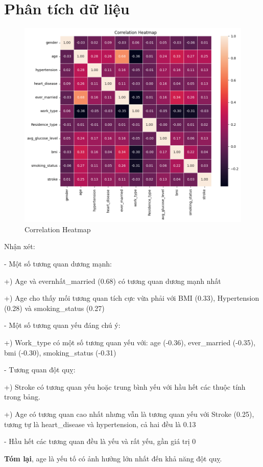\documentclass[11pt]{article}
\begin{document}
	\section{Phân tích dữ liệu}
	
	\begin{figure}[H]
		\centering
		\includegraphics[width=0.7\linewidth]{correlationHeatmap}
		\caption{Correlation Heatmap}
		\label{fig:correlationheatmap}
	\end{figure}
	Nhận xét:
	
	
	\begin{flushleft}
		- Một số tương quan dương mạnh:
		
		+) Age và evernhất\_married (0.68) có tương quan dương mạnh nhất
		
		+) Age cho thấy mối tương quan tích cực vừa phải với BMI (0.33), Hypertension (0.28) và smoking\_status (0.27)
		\vspace{0.2cm}
		
		- Một số tương quan yếu đáng chú ý:
		
		+) Work\_type có một số tương quan yếu với: age (-0.36), ever\_married (-0.35), bmi (-0.30), smoking\_status (-0.31)
		\vspace{0.2cm}
		
		- Tương quan đột quỵ:
		
		+) Stroke có tương quan yếu hoặc trung bình yếu với hầu hết các thuộc tính trong bảng.
		
		+) Age có tương quan cao nhất nhưng vẫn là tương quan yếu với Stroke (0.25), tương tự là heart\_disease và hypertension, cả hai đều là 0.13
		\vspace{0.2cm}
		
		- Hầu hết các tương quan đều là yếu và rất yếu, gần giá trị 0
		\vspace{0.2cm}
		
		\textbf{Tóm lại}, age là yếu tố có ảnh hưởng lớn nhất đến khả năng đột quỵ.
	\end{flushleft}
	
\end{document}

